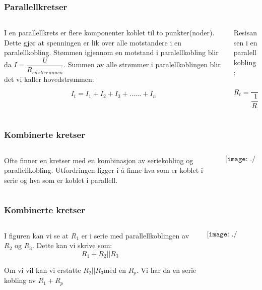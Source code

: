 \documentclass[aspectratio=169,xcolor=dvipsnames]{beamer}
\begin{document}
\begin{frame} \frametitle{Parallellkretser}
	\begin{columns}
		\begin{column}{0.5\textwidth}
			I en parallellkrets er flere komponenter koblet til to punkter(noder).
Dette gjør at spenningen er lik over alle motstandere i en paralellkobling.
Stømmen igjennom en motstand i paralellkobling blir da $I=\dfrac{U}{R_{en\,eller\,annen}}$.
Summen av alle strømmer i paralellkoblingen blir det vi kaller hovedstrømmen:

\[
I_{t}=I_{1}+I_{2}+I_{3}+......+I_{n}
\]

		\end{column}
		\begin{column}{0.5\textwidth}
Resisansen i en paralellkobling:

\[
R_{t}=\dfrac{1}{\dfrac{1}{R_{1}}+\dfrac{1}{R_{2}}+\dfrac{1}{R_{3}}+......+\dfrac{1}{R_{n}}}
\]

		\end{column}
	\end{columns}
\end{frame}


\begin{frame} \frametitle{Kombinerte kretser}
	\begin{columns}
		\begin{column}{0.5\textwidth}
			
Ofte finner en kretser med en kombinasjon av seriekobling og parallellkobling. Utfordringen ligger i å finne hva som er koblet i serie og hva som er koblet i parallell. 
		\end{column}
		\begin{column}{0.5\textwidth}
			$$\texttt{[image: ./kombieks1.pdf]}$$
		\end{column}
	\end{columns}
\end{frame}

\begin{frame} \frametitle{Kombinerte kretser}
	\begin{columns}
		\begin{column}{0.5\textwidth}
			

I figuren kan vi se at $R_{1}$
er i serie med parallellkoblingen av $R_{2}$ og $R_{3}$. Dette kan
vi skrive som:
\[
R_{1}+R_{2}||R_{3}
\]

Om vi vil kan vi erstatte $R_{2}||R_{3}$med en $R_{p}$. Vi har da
en serie kobling av $R_{1}+R_{p}$ 
		\end{column}
		\begin{column}{0.5\textwidth}
			$$\texttt{[image: ./kombieks1.pdf]}$$
		\end{column}
	\end{columns}
\end{frame}
\end{document}
